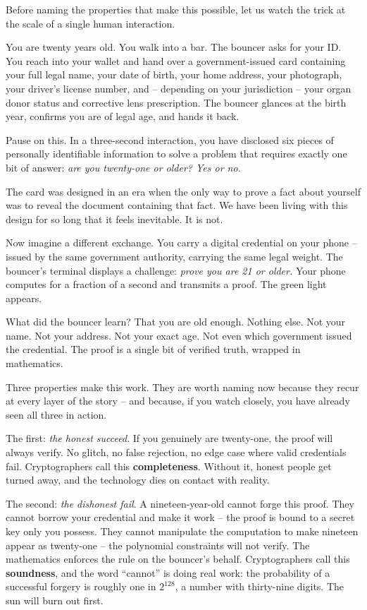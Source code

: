 \documentclass[
  11pt,
  openany]{report}
\renewcommand{\textbf}[1]{{\bfseries\color{MidnightBold}#1}}
\begin{document}
Before naming the properties that make this possible, let us watch the trick at
the scale of a single human interaction.

You are twenty years old. You walk into a bar. The bouncer asks for your ID. You
reach into your wallet and hand over a government-issued card containing your
full legal name, your date of birth, your home address, your photograph, your
driver's license number, and -- depending on your jurisdiction -- your organ
donor status and corrective lens prescription. The bouncer glances at the birth
year, confirms you are of legal age, and hands it back.

Pause on this. In a three-second interaction, you have disclosed six pieces of
personally identifiable information to solve a problem that requires exactly one
bit of answer: \emph{are you twenty-one or older? Yes or no.}

The card was designed in an era when the only way to prove a fact about yourself
was to reveal the document containing that fact. We have been living with this
design for so long that it feels inevitable. It is not.

Now imagine a different exchange. You carry a digital credential on your phone
-- issued by the same government authority, carrying the same legal weight. The
bouncer's terminal displays a challenge: \emph{prove you are 21 or older.} Your
phone computes for a fraction of a second and transmits a proof. The green light
appears.

What did the bouncer learn? That you are old enough. Nothing else. Not your
name. Not your address. Not your exact age. Not even which government issued the
credential. The proof is a single bit of verified truth, wrapped in mathematics.

Three properties make this work. They are worth naming now because they recur at
every layer of the story -- and because, if you watch closely, you have already
seen all three in action.

The first: \emph{the honest succeed}. If you genuinely are twenty-one, the proof
will always verify. No glitch, no false rejection, no edge case where valid
credentials fail. Cryptographers call this \textbf{completeness}. Without it,
honest people get turned away, and the technology dies on contact with reality.

The second: \emph{the dishonest fail}. A nineteen-year-old cannot forge this
proof. They cannot borrow your credential and make it work -- the proof is bound
to a secret key only you possess. They cannot manipulate the computation to make
nineteen appear as twenty-one -- the polynomial constraints will not verify. The
mathematics enforces the rule on the bouncer's behalf. Cryptographers call this
\textbf{soundness}, and the word ``cannot'' is doing real work: the probability
of a successful forgery is roughly one in \(2^{128}\), a number with thirty-nine
digits. The sun will burn out first.
\end{document}
